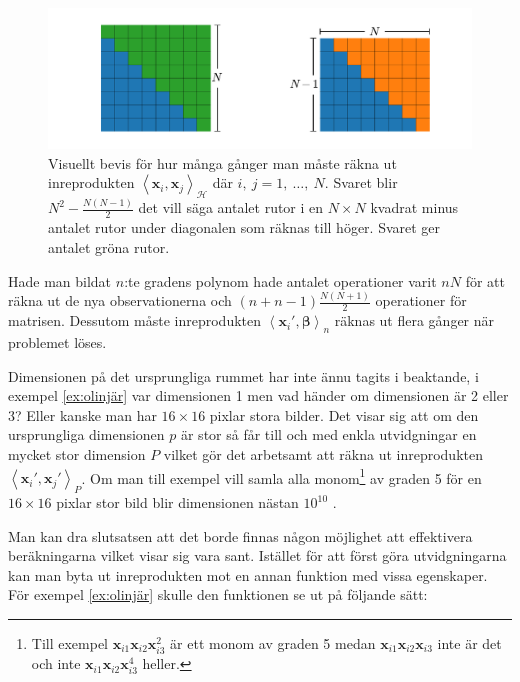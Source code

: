 \documentclass[a4paper, 12pt]{report}
\theoremstyle{definition}
\theoremstyle{remark}
\newcommand{\bfbeta}{{\boldsymbol{\beta}}}
\newcommand{\bfx}{\mathbf{x}}
\newcommand{\llangle}{\left\langle}
\newcommand{\rrangle}{\right\rangle}
\newcommand{\inner}[2]{\llangle #1, #2 \rrangle}
\newcommand{\hil}{\mathcal{H}}
\begin{document}
\begin{figure}[h]
	\centering
	\includegraphics[width=0.8\linewidth, trim={3.5cm 11mm 2.7cm 11mm}, clip]{KandFigur5.pdf}
	\caption{\label{fig:comb}Visuellt bevis för hur många gånger man måste räkna ut inreprodukten $\inner{\bfx_i}{\bfx_j}_\hil$ där $i,~j=1,~\dots,~N$. Svaret blir $N^2-\frac{N(N-1)}{2}$ det vill säga antalet rutor i en $N\times N$ kvadrat minus antalet rutor under diagonalen som räknas till höger. Svaret ger antalet gröna rutor.}
\end{figure}

Hade man bildat $n$:te gradens polynom hade antalet operationer varit $nN$ för att räkna ut de nya observationerna och $(n+n-1)\frac{N(N+1)}{2}$ operationer för matrisen. Dessutom måste inreprodukten $\inner{\bfx_i'}{\bfbeta}_n$ räknas ut flera gånger när problemet löses.

Dimensionen på det ursprungliga rummet har inte ännu tagits i beaktande, i exempel \ref{ex:olinjär} var dimensionen 1 men vad händer om dimensionen är 2 eller 3? Eller kanske man har $16\times16$ pixlar stora bilder. Det visar sig att om den ursprungliga dimensionen $p$ är stor så får till och med enkla utvidgningar en mycket stor dimension $P$ vilket gör det arbetsamt att räkna ut inreprodukten $\inner{\bfx_i'}{\bfx_j'}_P$. Om man till exempel vill samla alla monom\footnote{Till exempel $\bfx_{i1}\bfx_{i2}\bfx_{i3}^2$ är ett monom av graden 5 medan  $\bfx_{i1}\bfx_{i2}\bfx_{i3}$ inte är det och inte $\bfx_{i1}\bfx_{i2}\bfx_{i3}^4$ heller.} av graden 5 för en $16\times16$ pixlar stor bild blir dimensionen nästan $10^{10}$ \cite{LearningKernels}.

Man kan dra slutsatsen att det borde finnas någon möjlighet att effektivera beräkningarna vilket visar sig vara sant. Istället för att först göra utvidgningarna kan man byta ut inreprodukten mot en annan funktion med vissa egenskaper. För exempel \ref{ex:olinjär} skulle den funktionen se ut på följande sätt:
	
\end{document}
